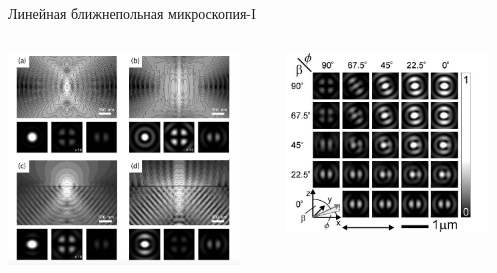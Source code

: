 \documentclass[9pt, compress, xcolor=table]{beamer}
\begin{document}
\begin{frame}{Линейная ближнепольная микроскопия-I}
\begin{columns}[c]
\column{6.5cm}
\begin{center}
\includegraphics[width=0.9\textwidth]{sm2}
\end{center}

\column{6.5cm}
\begin{center}
\includegraphics[width=0.9\textwidth]{sm3}
\end{center}


\end{columns}

\end{frame}
\end{document}
